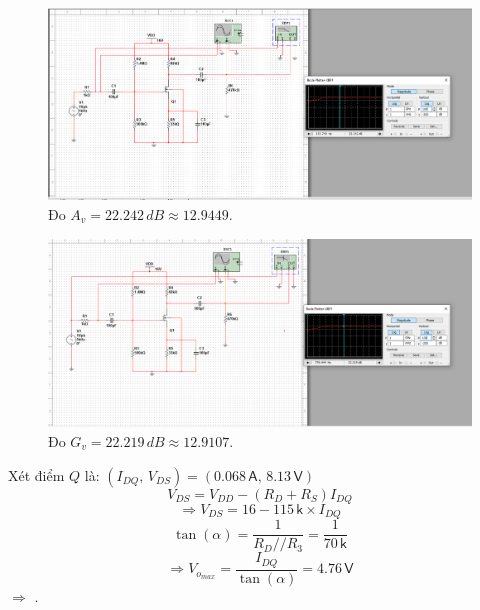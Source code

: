 \begin{figure}[H]
	\centering
	\includegraphics[width=\linewidth]{./my-chapters/my-images/Question1/Câu 1 Hình 1 b - Av.png}
	\caption{Đo $A_{v} = 22.242\,dB \approx 12.9449$.}
\end{figure}

\begin{figure}[H]
	\centering
	\includegraphics[width=\linewidth]{./my-chapters/my-images/Question1/Câu 1 Hình 1 b - Gv.png}
	\caption{Đo $G_{v} = 22.219\, dB \approx 12.9107$.}
\end{figure}

Xét điểm $Q$ là: $\left( I_{DQ}\textsf{, } V_{DS}\right) = \left( 0.068\,\textsf{A, } 8.13\,\textsf{V}\right)$
\[ V_{DS} = V_{DD} - \left( R_{D} + R_{S} \right) I_{DQ}\]
\[ \Rightarrow V_{DS} = 16 - 115\,\textsf{k}\times I_{DQ}\]
\[ \tan (\alpha) = \dfrac{1}{R_{D} // R_{3}} = \dfrac{1}{70\,\textsf{k}}\]
\[ \Rightarrow V_{o_{max}} = \dfrac{I_{DQ}}{\tan(\alpha)} = 4.76\,\textsf{V}\]
$\Rightarrow$ .

